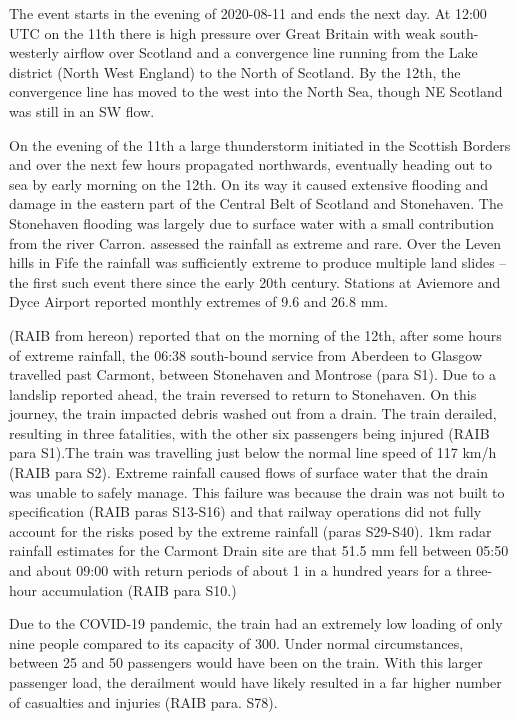 \documentclass[11pt,a4paper]{article}
\begin{document}
  The event starts in the evening of 2020-08-11 and ends the next day. At 12:00 UTC on the 11th there is high pressure over Great Britain with weak south-westerly airflow over Scotland and a convergence line running from the Lake district (North West England) to the North of Scotland\parencite{pritchard2020weather}. By the 12th, the convergence line has moved to the west into the North Sea, though NE Scotland was still in an SW flow. 

On  the evening of the 11th  a large thunderstorm initiated in the Scottish Borders and over the next few hours propagated northwards, eventually heading out to sea by early morning on the 12th\parencite{Kendon2020thunderstrorms_report}. On its way it caused extensive flooding and damage in the eastern part of the Central Belt of Scotland\parencite{SEPA2020report_floods,kendon2021ukclimate} and  Stonehaven. The Stonehaven flooding was largely due to surface water with a small contribution from the river Carron. \cite{SEPA2020report_floods} assessed the rainfall as  extreme and rare. Over the Leven hills in Fife the rainfall was sufficiently extreme to produce multiple land slides -- the first such event there since the early 20th century\parencite{Kirkbride2021}.  Stations at Aviemore and Dyce Airport\parencite{pritchard2020weather} reported monthly extremes of 9.6 and 26.8 mm.

\cite{carmontReport2024} (RAIB from hereon) reported that on the morning of the 12th, after some hours of extreme rainfall, the 06:38 south-bound service from Aberdeen to Glasgow travelled past Carmont, between Stonehaven and Montrose (para S1). Due to a landslip reported ahead, the train reversed to return to Stonehaven. On this journey, the train impacted debris washed out from a drain. The train derailed, resulting in three fatalities, with the other six passengers being injured (RAIB para S1).The train was travelling just below the normal line speed of 117 km/h (RAIB para S2). Extreme rainfall caused flows of surface water that the drain was unable to safely manage. This failure was because the drain was not built to specification (RAIB paras S13-S16) and that railway operations did not fully account for the risks posed by the extreme rainfall (paras S29-S40). 1km radar rainfall estimates for the Carmont Drain site are that 51.5 mm fell between 05:50 and about 09:00 with return periods of about 1 in a hundred years for a three-hour accumulation (RAIB para S10.)

Due to the COVID-19 pandemic, the train had an extremely low loading of only nine people compared to its capacity of 300. Under normal circumstances, between 25 and 50 passengers would have been on the train. With this larger passenger load, the derailment would have likely resulted in a far higher number of casualties and injuries (RAIB para. S78). 
\end{document}
